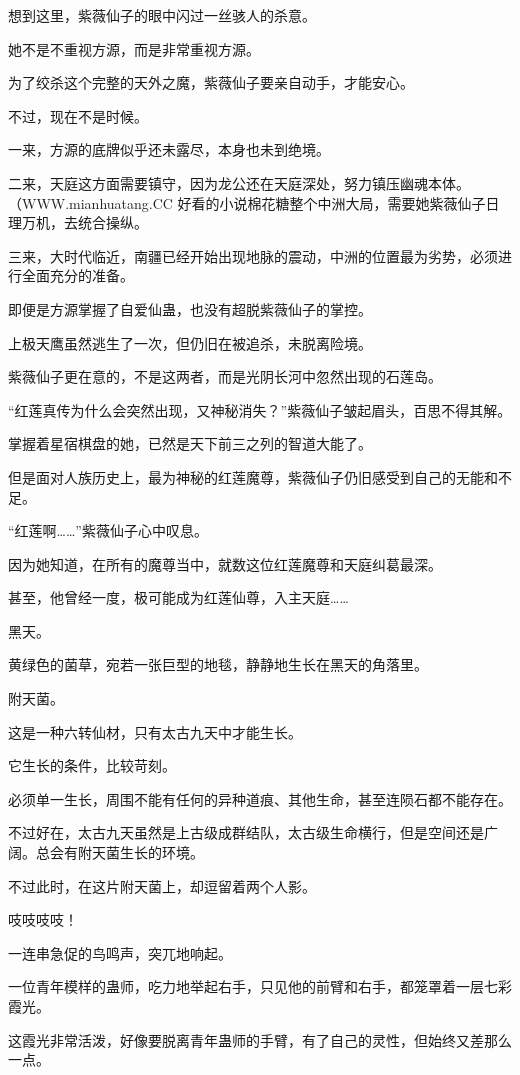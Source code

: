 \begin{this_body}
想到这里，紫薇仙子的眼中闪过一丝骇人的杀意。

她不是不重视方源，而是非常重视方源。

为了绞杀这个完整的天外之魔，紫薇仙子要亲自动手，才能安心。

不过，现在不是时候。

一来，方源的底牌似乎还未露尽，本身也未到绝境。

二来，天庭这方面需要镇守，因为龙公还在天庭深处，努力镇压幽魂本体。（WWW.mianhuatang.CC 好看的小说棉花糖整个中洲大局，需要她紫薇仙子日理万机，去统合操纵。

三来，大时代临近，南疆已经开始出现地脉的震动，中洲的位置最为劣势，必须进行全面充分的准备。

即便是方源掌握了自爱仙蛊，也没有超脱紫薇仙子的掌控。

上极天鹰虽然逃生了一次，但仍旧在被追杀，未脱离险境。

紫薇仙子更在意的，不是这两者，而是光阴长河中忽然出现的石莲岛。

“红莲真传为什么会突然出现，又神秘消失？”紫薇仙子皱起眉头，百思不得其解。

掌握着星宿棋盘的她，已然是天下前三之列的智道大能了。

但是面对人族历史上，最为神秘的红莲魔尊，紫薇仙子仍旧感受到自己的无能和不足。

“红莲啊……”紫薇仙子心中叹息。

因为她知道，在所有的魔尊当中，就数这位红莲魔尊和天庭纠葛最深。

甚至，他曾经一度，极可能成为红莲仙尊，入主天庭……

黑天。

黄绿色的菌草，宛若一张巨型的地毯，静静地生长在黑天的角落里。

附天菌。

这是一种六转仙材，只有太古九天中才能生长。

它生长的条件，比较苛刻。

必须单一生长，周围不能有任何的异种道痕、其他生命，甚至连陨石都不能存在。

不过好在，太古九天虽然是上古级成群结队，太古级生命横行，但是空间还是广阔。总会有附天菌生长的环境。

不过此时，在这片附天菌上，却逗留着两个人影。

吱吱吱吱！

一连串急促的鸟鸣声，突兀地响起。

一位青年模样的蛊师，吃力地举起右手，只见他的前臂和右手，都笼罩着一层七彩霞光。

这霞光非常活泼，好像要脱离青年蛊师的手臂，有了自己的灵性，但始终又差那么一点。


\end{this_body}
